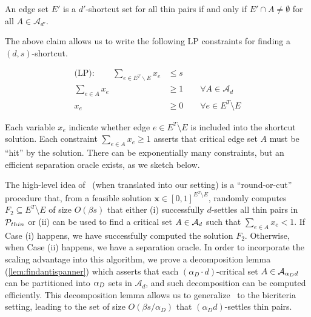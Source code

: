 \begin{claim} \label{clm:shortcut-hittingset}
    An edge set $E'$ is a $d'$-shortcut set for all thin pairs if and only if $E' \cap A \neq \emptyset$  for all $A\in\mathcal{A}_{d'}$. 
\end{claim}





The above claim allows us to write the following LP constraints for finding a $(d,s)$-shortcut. 


\begin{align*}
	\text{(LP)}: \qquad\sum_{e\in E^T\backslash E}x_e &\le s \\
	\sum_{e\in A}x_e &\ge 1\qquad \forall A\in \mathcal{A}_d\\
	x_e &\geq 0\qquad \forall e\in E^T \setminus E
\end{align*}

Each variable $x_e$ indicate whether edge $e \in E^T \setminus E$ is included into the shortcut solution. Each constraint $\sum_{e \in A} x_e \geq 1$ asserts that critical edge set $A$ must be ``hit'' by the solution. There can be exponentially many constraints, but an efficient separation oracle exists, as we sketch below. 



The high-level idea of~\cite{BermanBMRY13} (when translated into our setting) is a ``round-or-cut'' procedure that, from a feasible solution $\textbf{x} \in [0,1]^{E^T \setminus E}$, randomly computes $F_2 \subseteq E^T \setminus E$ of  size $O(\beta s)$ that either (i) successfully $d$-settles all thin pairs in $\mathcal{P}_{thin}$ or (ii) can be used to find a critical set $A \in \mathcal{A}_{d}$ such that $\sum_{e \in A} x_e < 1$. 
If Case (i) happens, we have successfully computed the solution $F_2$. Otherwise, when Case (ii) happens, we have a separation oracle. 
In order to incorporate the scaling advantage into this algorithm, we prove a decomposition lemma (\cref{lem:findantispanner}) which asserts that each $(\alpha_D \cdot d)$-critical set $A \in\mathcal{A}_{\alpha_D d}$ can be partitioned into $\alpha_D$  sets in $\mathcal{A}_{d}$, and such decomposition can be computed efficiently.
This decomposition lemma allows us to generalize~\cite{BermanBMRY13} to the bicriteria setting, leading to the set of size $O(\beta s/\alpha_D)$ that $(\alpha_D d)$-settles thin pairs. 



















